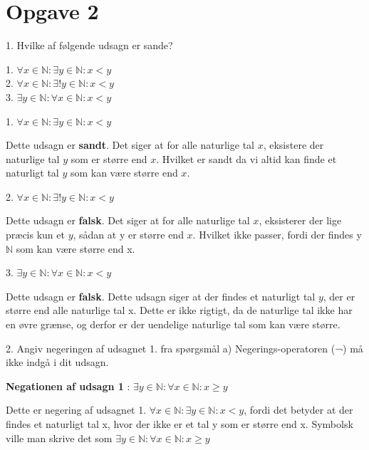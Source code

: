 \documentclass{article}
\begin{document}
\section*{Opgave 2}

1. Hvilke af følgende udsagn er sande?

\begin{center}
    1. $\forall x \in \mathbb{N}: \exists y \in \mathbb{N}: x<y$
\\
    2. $\forall x \in \mathbb{N}: \exists ! y \in \mathbb{N}: x<y$
\\
    3. $\exists y \in \mathbb{N}: \forall x \in \mathbb{N}: x<y$
    
\end{center}

1. $\forall x \in \mathbb{N}: \exists y \in \mathbb{N}: x<y$

Dette udsagn er \textbf{sandt}. Det siger at for alle naturlige tal $x$, eksistere der naturlige tal $y$ som er større end $x$. Hvilket er sandt da vi altid kan finde et naturligt tal $y$ som kan være større end $x$.

2. $\forall x \in \mathbb{N}: \exists ! y \in \mathbb{N}: x<y$

Dette udsagn er \textbf{falsk}. Det siger at for alle naturlige tal $x$, eksisterer der lige præcis kun et $y$, sådan at y er større end $x$. Hvilket ikke passer, fordi der findes y $\mathbb{N}$ som kan være større end x. 

3. $\exists y \in \mathbb{N}: \forall x \in \mathbb{N}: x<y$

Dette udsagn er \textbf{falsk}. Dette udsagn siger at der findes et naturligt tal $y$, der er større end alle naturlige tal x. Dette er ikke rigtigt, da de naturlige tal ikke har en øvre grænse, og derfor er der uendelige naturlige tal som kan være større. 

2. Angiv negeringen af udsagnet 1. fra spørgsmål a) Negerings-operatoren (¬) må ikke indgå i dit udsagn.
\\

\begin{center}
    \textbf{Negationen af udsagn 1}  : $\exists y \in \mathbb{N}: \forall x \in \mathbb{N}: x \geq y$

\end{center}

Dette er negering af udsagnet 1. $\forall x \in \mathbb{N}: \exists y \in \mathbb{N}: x<y$, fordi det betyder at der findes et naturligt tal x, hvor der ikke er et tal y som er større end x. Symbolsk ville man skrive det som $\exists y \in \mathbb{N}: \forall x \in \mathbb{N}: x \geq y$
\\
\\
\end{document}
